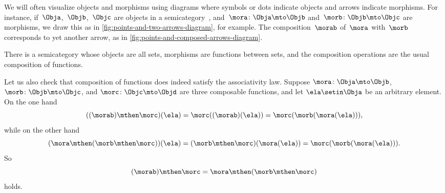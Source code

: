 \begin{remark}
    We will often visualize objects and morphisms using diagrams where symbols or dots indicate objects and arrows indicate morphisms.
    For instance, if~$\Obja$,~$\Objb$,~$\Objc$ are objects in a semicategory~\CatC, and~$\mora\colon \Obja \mto \Objb$ and~$\morb\colon \Objb \mto \Objc$ are morphisms, we draw this as in \cref{fig:points-and-two-arrows-diagram}, for example.
    The composition~$\morab$ of~$\mora$ with~$\morb$ corresponds to yet another arrow, as in \cref{fig:points-and-composed-arrows-diagram}.
\end{remark}

\begin{example}
    \label{exa:the-semicategory-of-sets}
    There is a semicategory whose objects are all sets, morphisms are functions between sets, and the composition operations are the usual composition of functions.

    Let us also check that composition of functions does indeed satisfy the associativity law.
    Suppose $\mora \colon \Obja \mto \Objb$,  $\morb\colon \Objb \mto \Objc$, and  $\morc \colon \Objc \mto \Objd$ are three composable functions, and let $\ela \setin \Obja$ be an arbitrary element.
    On the one hand
    \begin{equation}\label{eq:function-associativity-1}
        ((\morab) \mthen \morc)(\ela) =  \morc((\morab)(\ela)) = \morc (\morb (\mora (\ela))),
    \end{equation}
    while on the other hand
    \begin{equation}\label{eq:function-associativity-2}
        (\mora \mthen (\morb \mthen \morc))(\ela)
        =  (\morb \mthen \morc)(\mora(\ela)) = \morc (\morb (\mora (\ela))).
    \end{equation}
    So
    \begin{equation}\label{eq:function-associativity-3}
        (\morab)
        \mthen \morc = \mora \mthen (\morb \mthen \morc)
    \end{equation}
    holds.
\end{example}

